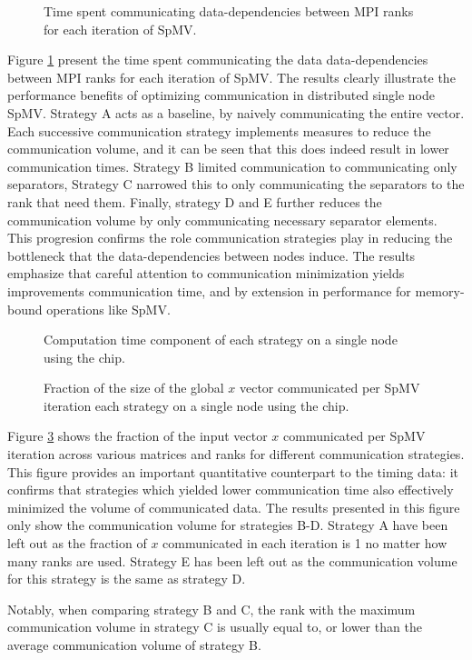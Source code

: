 \begin{figure}[H]
    \centering
    \caption{Time spent communicating data-dependencies between MPI ranks for each iteration of SpMV.}
    \label{fig:tcommdefqsingle}
\end{figure}

Figure \ref{fig:tcommdefqsingle} present the time spent communicating the data data-dependencies between MPI ranks for each iteration of SpMV. The results clearly illustrate the performance benefits of optimizing communication in distributed single node SpMV. Strategy A acts as a baseline, by naively communicating the entire vector. Each successive communication strategy implements measures to reduce the communication volume, and it can be seen that this does indeed result in lower communication times. Strategy B limited communication to communicating only separators, Strategy C narrowed this to only communicating the separators to the rank that need them. Finally, strategy D and E further reduces the communication volume by only communicating necessary separator elements. This progresion confirms the role communication strategies play in reducing the bottleneck that the data-dependencies between nodes induce. The results emphasize that careful attention to communication minimization yields improvements communication time, and by extension in performance for memory-bound operations like SpMV.

\begin{figure}[H]
    \centering
    \caption{Computation time component of each strategy on a single node using the  chip.}
    \label{fig:tcompdefqsingle}
\end{figure}

\begin{figure}[H]
    \centering
    \caption{Fraction of the size of the global \(x\) vector communicated per SpMV iteration each strategy on a single node using the  chip.}
    \label{fig:commloaddefqsingle}
\end{figure}
Figure \ref{fig:commloaddefqsingle} shows the fraction of the input vector \(x\) communicated per SpMV iteration across various matrices and ranks for different communication strategies. This figure provides an important quantitative counterpart to the timing data: it confirms that strategies which yielded lower communication time also effectively minimized the volume of communicated data. The results presented in this figure only show the communication volume for strategies B-D. Strategy A have been left out as the fraction of \(x\) communicated in each iteration is 1 no matter how many ranks are used. Strategy E has been left out as the communication volume for this strategy is the same as strategy D.
\medskip

Notably, when comparing strategy B and C, the rank with the maximum communication volume in strategy C is usually equal to, or lower than the average communication volume of strategy B.


